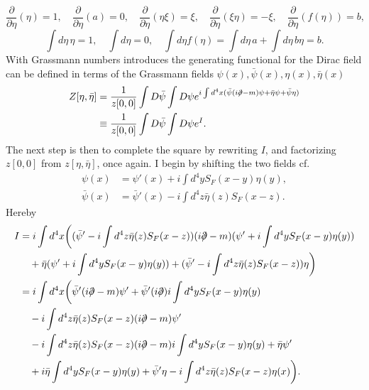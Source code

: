 \begin{equation}
	\frac{\partial }{\partial \eta}(\eta)=1, \quad \frac{\partial }{\partial \eta}(a)=0, \quad \frac{\partial }{\partial \eta}(\eta\xi)=\xi, \quad \frac{\partial }{\partial \eta}(\xi\eta)=-\xi, \quad \frac{\partial }{\partial \eta}(f(\eta))=b,
\end{equation} 
\begin{equation}
	\int d\eta \,\eta =1, \quad \int d\eta =0, \quad \int d\eta f(\eta)=\int d\eta\, a+\int d\eta \, b\eta=b.
\end{equation} 	
With Grassmann numbers introduces the generating functional for the Dirac field can be defined in terms of the Grassmann fields $\psi(x),\bar{\psi}(x),\eta(x), \bar{\eta}(x)$
\begin{equation}
		\begin{split}
			Z[\eta,\bar{\eta}]&=\frac{1}{z[0,0]}\int D\bar{\psi}\int D\psi e^{i\int d^4x(\bar{\psi}(i\slashed \partial -m)\psi+\bar{\eta}\psi+\bar{\psi}\eta)}\\
			&\equiv\frac{1}{z[0,0]}\int D\bar{\psi}\int D\psi e^{I}.
		\end{split}
\end{equation} 	
The next step is then to complete the square by rewriting $I$, and factorizing $z[0,0]$ from $z[\eta,\bar{\eta}]$, once again. I begin by shifting the two fields cf.
\begin{equation}
	\begin{split}
		\psi(x)&=\psi'(x)+i\int d^4yS_F(x-y)\eta(y),\\
		\bar{\psi}(x)&=\bar{\psi}'(x)-i\int d^4z\bar{\eta}(z)S_F(x-z).
	\end{split}
\end{equation} 
Hereby
\begin{equation}
	\begin{split}
		I&=i\int d^4x\bigg((\bar{\psi}'-i\int d^4z\bar{\eta}(z)S_F(x-z))(i\slashed \partial -m)(\psi'+i\int d^4yS_F(x-y)\eta(y))\\
		&\quad+\bar{\eta}(\psi'+i\int d^4yS_F(x-y)\eta(y))+(\bar{\psi}'-i\int d^4z\bar{\eta}(z)S_F(x-z))\eta\bigg)\\
		&=i\int d^4x\bigg(\bar{\psi}'(i\slashed \partial-m)\psi'+\bar{\psi}'(i\slashed \partial)i\int d^4yS_F(x-y)\eta(y)\\
		& \quad-i\int d^4z\bar{\eta}(z)S_F(x-z)(i\slashed \partial -m)\psi'\\
		&\quad-i\int d^4z\bar{\eta}(z)S_F(x-z)(i\slashed \partial-m)i\int d^4yS_F(x-y)\eta(y)+\bar{\eta}\psi'\\
		&\quad + i\bar{\eta}\int d^4yS_F(x-y)\eta(y)+\bar{\psi}'\eta-i\int d^4z\bar{\eta}(z)S_F(x-z)\eta(x)\bigg).\\
	\end{split}
\end{equation} 
